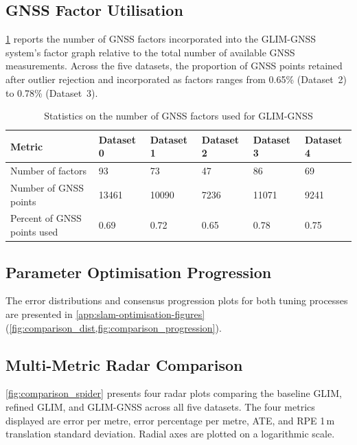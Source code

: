 \subsection{GNSS Factor Utilisation}

\cref{tab:gnss_stats} reports the number of GNSS factors incorporated into the GLIM-GNSS system's factor graph relative to the total number of available GNSS measurements. Across the five datasets, the proportion of GNSS points retained after outlier rejection and incorporated as factors ranges from 0.65\% (Dataset~2) to 0.78\% (Dataset~3).

\begin{table}[htbp]
\centering
\caption{Statistics on the number of GNSS factors used for GLIM-GNSS}
\label{tab:gnss_stats}
\begin{tabularx}{\textwidth}{lXXXXX}
\toprule
\textbf{Metric} & \textbf{Dataset 0} & \textbf{Dataset 1} & \textbf{Dataset 2} & \textbf{Dataset 3} & \textbf{Dataset 4} \\ \midrule
Number of factors & 93 & 73 & 47 & 86 & 69 \\
Number of GNSS points & 13461 & 10090 & 7236 & 11071 & 9241 \\
Percent of GNSS points used & 0.69 & 0.72 & 0.65 & 0.78 & 0.75 \\ \bottomrule
\end{tabularx}
\end{table}

\subsection{Parameter Optimisation Progression}

The error distributions and consensus progression plots for both tuning processes are presented in \cref{app:slam-optimisation-figures} (\cref{fig:comparison_dist,fig:comparison_progression}).

\subsection{Multi-Metric Radar Comparison}

\cref{fig:comparison_spider} presents four radar plots comparing the baseline GLIM, refined GLIM, and GLIM-GNSS across all five datasets. The four metrics displayed are error per metre, error percentage per metre, ATE, and RPE 1\,m translation standard deviation. Radial axes are plotted on a logarithmic scale.

